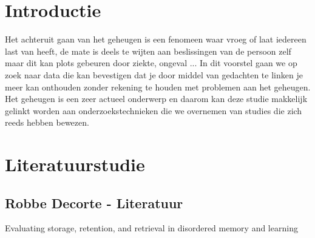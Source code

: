 \documentclass{voorstel}
\affiliation{\textbf{Contact:}
	\textsuperscript{1} \href{mailto:robbe.decorte@student.hogent.be}{robbe.decorte@student.hogent.be};
}
\begin{document}
	
	\flushbottom %
	\maketitle %
	\tableofcontents %
	\thispagestyle{empty} %
	
	
	
	\section{Introductie} %
	\label{sec:introductie}

	Het achteruit gaan van het geheugen is een fenomeen waar vroeg of laat iedereen last van heeft, de mate is deels te wijten aan beslissingen van de persoon zelf maar dit kan plots gebeuren door ziekte, ongeval ... In dit voorstel gaan we op zoek naar data die kan bevestigen dat je door middel van gedachten te linken je meer kan onthouden zonder rekening te houden met problemen aan het geheugen. Het geheugen is een zeer actueel onderwerp en daarom kan deze studie makkelijk gelinkt worden aan onderzoekstechnieken die we overnemen van studies die zich reeds hebben bewezen.
	
	
	\section{Literatuurstudie}
	\subsection{Robbe Decorte - Literatuur}
	Evaluating storage, retention, and retrieval in disordered memory and learning \autocite{BuschkeFuld1974}
	
\end{document}
